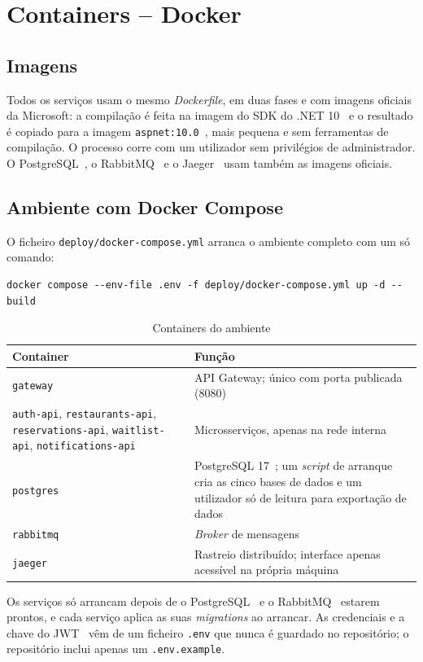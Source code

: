 \chapter{Containers -- Docker}
\label{cap:implantacao}

\section{Imagens}

Todos os serviços usam o mesmo \textit{Dockerfile}, em duas fases e com imagens oficiais da
Microsoft: a compilação é feita na imagem do SDK do .NET 10~\cite{dotnet} e o resultado é copiado para a imagem
\texttt{aspnet:10.0}~\cite{aspnetcore}, mais pequena e sem ferramentas de compilação. O processo corre com um
utilizador sem privilégios de administrador. O PostgreSQL~\cite{postgresql}, o RabbitMQ~\cite{rabbitmq} e o Jaeger~\cite{jaeger} usam também as
imagens oficiais.

\section{Ambiente com Docker Compose}

O ficheiro \texttt{deploy/docker-compose.yml} arranca o ambiente completo com um só comando:

\begin{verbatim}
docker compose --env-file .env -f deploy/docker-compose.yml up -d --build
\end{verbatim}

\begin{table}[H]
\centering
\small
\renewcommand{\arraystretch}{1.2}
\begin{tabularx}{\textwidth}{>{\raggedright\arraybackslash}p{} X}
\toprule
\textbf{Container} & \textbf{Função} \\
\midrule
\texttt{gateway} & API Gateway; único com porta publicada (8080) \\
\texttt{auth-api}, \texttt{restaurants-api}, \texttt{reservations-api}, \texttt{waitlist-api}, \texttt{notifications-api}
& Microsserviços, apenas na rede interna \\
\texttt{postgres}
& PostgreSQL 17~\cite{postgresql}; um \textit{script} de arranque cria as cinco bases de dados e um utilizador só de leitura para exportação de dados \\
\texttt{rabbitmq}
& \textit{Broker} de mensagens \\
\texttt{jaeger}
& Rastreio distribuído; interface apenas acessível na própria máquina \\
\bottomrule
\end{tabularx}
\caption{Containers do ambiente}
\label{tab:containeres}
\end{table}

Os serviços só arrancam depois de o PostgreSQL~\cite{postgresql} e o RabbitMQ~\cite{rabbitmq} estarem prontos, e cada serviço aplica as suas \textit{migrations} ao arrancar. As credenciais e a
chave do JWT~\cite{rfc7519} vêm de um ficheiro \texttt{.env} que nunca é guardado no repositório; o repositório
inclui apenas um \texttt{.env.example}.
